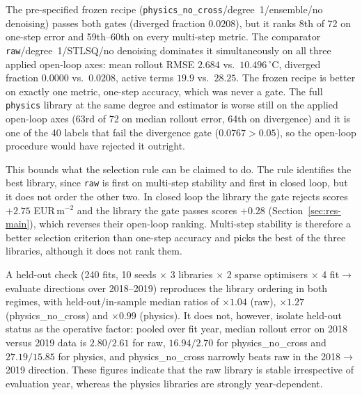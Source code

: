The pre-specified frozen recipe
(\texttt{physics\_no\_cross}/degree~1/ensemble/no denoising) passes both gates
(diverged fraction $0.0208$), but it ranks 8th of 72 on one-step error and 59th--60th on
every multi-step metric. The comparator \texttt{raw}/degree~1/STLSQ/no denoising
dominates it simultaneously on all three applied open-loop axes: mean rollout RMSE $2.684$
vs.\ $10.496\,^\circ$C, diverged fraction $0.0000$ vs.\ $0.0208$, active terms $19.9$ vs.\
$28.25$. The frozen recipe is better on exactly one metric, one-step accuracy, which was
never a gate. The full \texttt{physics} library at the same degree and estimator is worse
still on the applied open-loop axes (63rd of 72 on median rollout error, 64th on divergence) and it is one of the 40 labels that fail the divergence gate
($0.0767 > 0.05$), so the open-loop procedure would have rejected it outright.

This bounds what the selection rule can be claimed to do. The rule identifies the best
library, since \texttt{raw} is first on multi-step stability and first in closed loop, but
it does not order the other two. In closed loop the library the gate rejects scores $+2.75$
EUR\,m$^{-2}$ and the library the gate passes scores $+0.28$ (Section~\ref{sec:res-main}), which
reverses their open-loop ranking. Multi-step stability is therefore a better selection
criterion than one-step accuracy and picks the best of the three libraries, although it
does not rank them.

A held-out check (240 fits, 10 seeds $\times$ 3 libraries $\times$ 2 sparse optimisers
$\times$ 4 fit$\to$evaluate directions over 2018--2019) reproduces the library ordering in
both regimes, with held-out/in-sample median ratios of $\times 1.04$ (raw), $\times 1.27$
(physics\_no\_cross) and $\times 0.99$ (physics). It does not, however, isolate held-out
status as the operative factor: pooled over fit year, median rollout error on 2018 versus
2019 data is $2.80/2.61$ for raw, $16.94/2.70$ for physics\_no\_cross and $27.19/15.85$ for
physics, and physics\_no\_cross narrowly beats raw in the 2018$\to$2019 direction. These
figures indicate that the raw library is stable irrespective of evaluation year, whereas
the physics libraries are strongly year-dependent.

